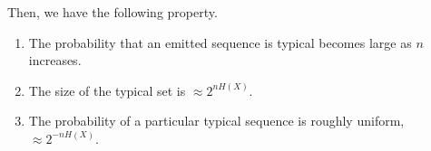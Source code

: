 \noindent Then, we have the following property.
\begin{lemma}
\begin{enumerate}
    \item The probability that an emitted sequence is typical becomes large as $n$ increases.
    \item The size of the typical set is $\approx 2^{nH(X)}$.
    \item The probability of a particular typical sequence is roughly uniform, $\approx 2^{-nH(X)}$.
\end{enumerate}
\end{lemma}
\newpage 